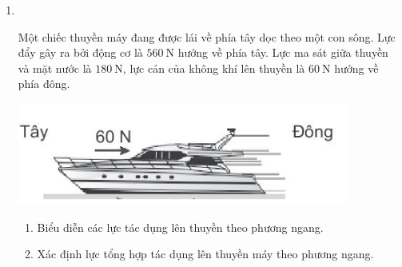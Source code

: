 \begin{enumerate}[label=\bfseries Bài \arabic*:,leftmargin=1.5cm]
\item {}\\
{Một chiếc thuyền máy đang được lái về phía tây dọc theo một con sông. Lực đẩy gây ra bởi động cơ là $\SI{560}{\newton}$ hướng về phía tây. Lực ma sát giữa thuyền và mặt nước là $\SI{180}{\newton}$, lực cản của không khí lên thuyền là $\SI{60}{\newton}$ hướng về phía đông.
	\begin{center}
		\includegraphics[width=0.4\linewidth]{../figs/VN10-2022-PH-TP020-P-3}
	\end{center}
\begin{enumerate}[label=\alph*)]
	\item Biểu diễn các lực tác dụng lên thuyền theo phương ngang.
	\item Xác định lực tổng hợp tác dụng lên thuyền máy theo phương ngang.
\end{enumerate}
}


\end{enumerate}
